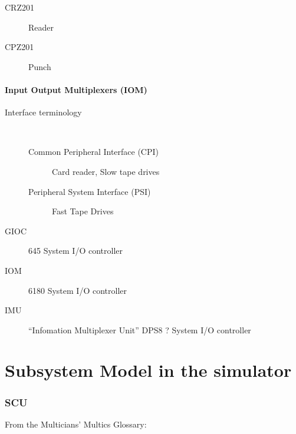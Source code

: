 \documentclass[notitlepage]{report}
\begin{document}
    \begin{description}

        \item[CRZ201] Reader
        \item[CPZ201] Punch

    \end{description}

\subsection{Input Output Multiplexers (IOM)}

    \begin{description}
        \item[Interface terminology] \hfill \\

            \begin{description}
              \item[Common Peripheral Interface (CPI)] Card reader, Slow tape drives
              \item[Peripheral System Interface (PSI)] Fast Tape Drives
            \end{description}

        \item [GIOC]645 System I/O controller

        \item [IOM] 6180 System I/O controller

        \item [IMU] ``Infomation Multiplexer Unit'' DPS8 ? System I/O controller

    \end{description}

\part{Subsystem Model in the simulator}

\section{SCU}

From the Multicians' Multics Glossary:
\end{document}
